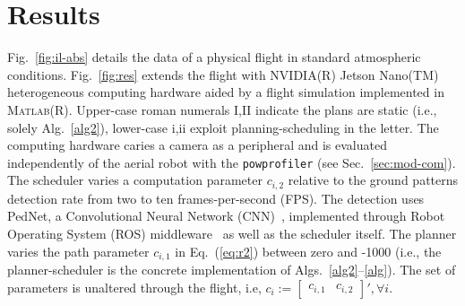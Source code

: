 \documentclass[letterpaper,10pt,journal,twoside]{IEEEtran}
\newcommand{\stt}[1]{{\small\tt #1}} %
\newcommand{\powprof}{\stt{powprofiler}}
\theoremstyle{definition}
\begin{document}
\vspace*{-1.6ex}
\section{Results}         %
\label{sec:experimental}  %

Fig.~\ref{fig:il-abs} details the data of a physical flight  
in standard atmospheric conditions. 
Fig.~\ref{fig:res} extends the flight with NVIDIA\hspace{.5ex}(R) Jetson Nano\hspace{.5ex}(TM) heterogeneous computing hardware aided by a flight simulation implemented in \textsc{Matlab}\hspace{.5ex}(R). 
Upper-case roman numerals I,II indicate the plans are static (i.e., solely Alg.~\ref{alg2}), lower-case i,ii exploit planning-scheduling in the letter.
The computing hardware caries a camera as a peripheral and is evaluated independently of the aerial robot with the \powprof{} (see Sec.~\ref{sec:mod-com}). The scheduler varies a computation parameter $c_{i,2}$ relative to the ground patterns detection rate from two to ten frames-per-second (FPS). The detection uses PedNet, a Convolutional Neural Network (CNN)~\cite{ullah2018pednet}, implemented through Robot Operating System (ROS) middleware~\cite{quigley2009ros} as well as the scheduler itself. The planner varies the path parameter $c_{i,1}$ in Eq.~(\ref{eq:r2}) between zero and -1000 (i.e., the planner-scheduler is the concrete implementation of Algs.~\ref{alg2}--\ref{alg}). The set of parameters is unaltered through the flight, i.e, $c_i:=\begin{bmatrix}c_{i,1}&c_{i,2}\end{bmatrix}',\forall i$.


\end{document}
